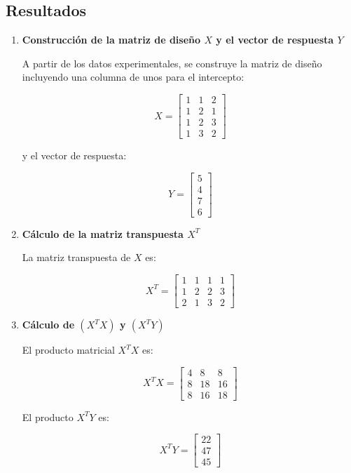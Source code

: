 \subsection*{Resultados}

\begin{enumerate}[label=\alph*)]

\item \textbf{Construcción de la matriz de diseño $X$ y el vector de respuesta $Y$}

A partir de los datos experimentales, se construye la matriz de diseño incluyendo una columna de unos para el intercepto:

\[
X =
\begin{bmatrix}
1 & 1 & 2 \\
1 & 2 & 1 \\
1 & 2 & 3 \\
1 & 3 & 2
\end{bmatrix}
\]

y el vector de respuesta:

\[
Y =
\begin{bmatrix}
5 \\
4 \\
7 \\
6
\end{bmatrix}
\]

\item \textbf{Cálculo de la matriz transpuesta $X^T$}

La matriz transpuesta de $X$ es:

\[
X^T =
\begin{bmatrix}
1 & 1 & 1 & 1 \\
1 & 2 & 2 & 3 \\
2 & 1 & 3 & 2
\end{bmatrix}
\]

\item \textbf{Cálculo de $(X^T X)$ y $(X^T Y)$}

El producto matricial $X^T X$ es:

\[
X^T X =
\begin{bmatrix}
4 & 8 & 8 \\
8 & 18 & 16 \\
8 & 16 & 18
\end{bmatrix}
\]

El producto $X^T Y$ es:

\[
X^T Y =
\begin{bmatrix}
22 \\
47 \\
45
\end{bmatrix}
\]


\end{enumerate}
